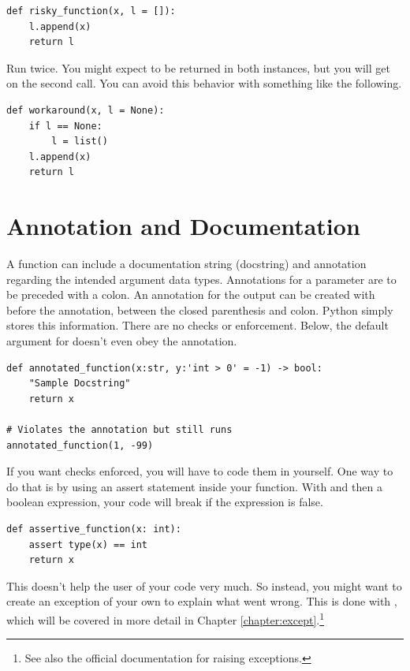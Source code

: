 \begin{lstlisting}
def risky_function(x, l = []):
    l.append(x)
    return l
\end{lstlisting}

Run  twice. You might expect \code{['a']} to be returned in both instances, but you will get \code{['a','a']} on the second call. You can avoid this behavior with something like the following. 

\begin{lstlisting}
def workaround(x, l = None):
    if l == None:
        l = list()
    l.append(x)
    return l
\end{lstlisting}

\section{Annotation and Documentation}

A function can include a documentation string (docstring) and annotation regarding the intended argument data types. Annotations for a parameter are to be preceded with a colon. An annotation for the output can be created with \code{->} before the annotation, between the closed parenthesis and colon. Python simply stores this information. There are no checks or enforcement. Below, the default argument for  doesn't even obey the annotation. 

\begin{lstlisting}
def annotated_function(x:str, y:'int > 0' = -1) -> bool:
    "Sample Docstring"
    return x
    
# Violates the annotation but still runs
annotated_function(1, -99)
\end{lstlisting}

If you want checks enforced, you will have to code them in yourself. One way to do that is by using an assert statement inside your function. With  and then a boolean expression, your code will break if the expression is false.

\begin{lstlisting}
def assertive_function(x: int):
    assert type(x) == int
    return x
\end{lstlisting}

This doesn't help the user of your code very much. So instead, you might want to create an exception of your own to explain what went wrong. This is done with , which will be covered in more detail in Chapter \ref{chapter:except}.\footnote{See also the {official documentation} for raising exceptions.}

